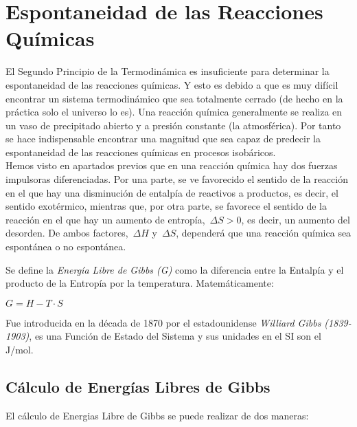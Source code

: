 \section{Espontaneidad de las Reacciones Químicas}

El Segundo Principio de la Termodinámica es insuficiente para determinar la espontaneidad de las reacciones químicas. Y esto es debido a que es muy difícil encontrar un sistema termodinámico que sea totalmente cerrado (de hecho en la práctica solo el universo lo es). Una reacción química generalmente se realiza en un vaso de precipitado abierto y a presión constante (la atmosférica). Por tanto se hace indispensable encontrar una magnitud que sea capaz de predecir la espontaneidad de las reacciones químicas en procesos isobáricos.\\

Hemos visto en apartados previos que en una reacción química hay dos fuerzas impulsoras diferenciadas. Por una parte, se ve favorecido el sentido de la reacción en el que hay una disminución de entalpía de reactivos a productos, es decir, el sentido exotérmico, mientras que, por otra parte, se favorece el sentido de la reacción en el que hay un aumento de entropía, $\Delta S > 0$, es decir, un aumento del desorden. De ambos factores, $\Delta H$ y $\Delta S$, dependerá que una reacción química sea espontánea o no espontánea.\\

\begin{definition}
	Se define la \emph{Energía Libre de Gibbs (G)} como la diferencia entre la Entalpía y el producto de la Entropía por la temperatura. Matemáticamente:\\
	\begin{center}
		$G = H-T\cdot S$
	\end{center}
\end{definition}

Fue introducida en la década de 1870 por el estadounidense \emph{Williard Gibbs (1839-1903)}, es una Función de Estado del Sistema y sus unidades en el SI son el J/mol.

\subsection{Cálculo de Energías Libres de Gibbs}

El cálculo de Energias Libre de Gibbs se puede realizar de dos maneras:\\

